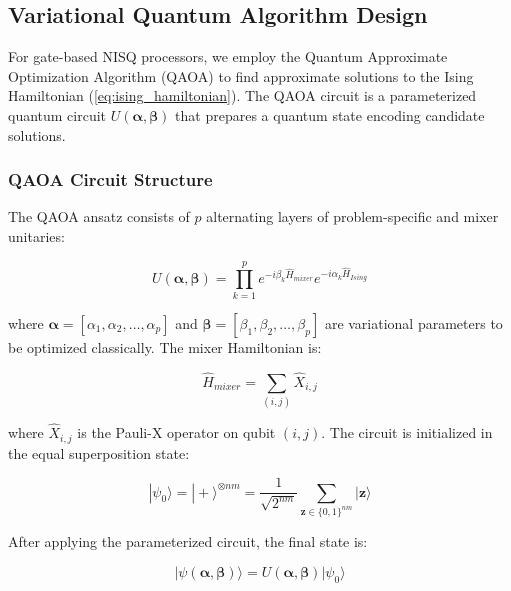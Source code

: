 \documentclass[lettersize,journal]{IEEEtran}
\begin{document}
\subsection{Variational Quantum Algorithm Design}
\label{subsec:vqa_design}

For gate-based NISQ processors, we employ the Quantum Approximate Optimization Algorithm (QAOA) to find approximate solutions to the Ising Hamiltonian (\ref{eq:ising_hamiltonian}). The QAOA circuit is a parameterized quantum circuit $U(\boldsymbol{\alpha}, \boldsymbol{\beta})$ that prepares a quantum state encoding candidate solutions.

\subsubsection{QAOA Circuit Structure}

The QAOA ansatz consists of $p$ alternating layers of problem-specific and mixer unitaries:

\begin{equation}
U(\boldsymbol{\alpha}, \boldsymbol{\beta}) = \prod_{k=1}^{p} e^{-i\beta_k \hat{H}_{mixer}} e^{-i\alpha_k \hat{H}_{Ising}}
\label{eq:qaoa_circuit}
\end{equation}

where $\boldsymbol{\alpha} = [\alpha_1, \alpha_2, \ldots, \alpha_p]$ and $\boldsymbol{\beta} = [\beta_1, \beta_2, \ldots, \beta_p]$ are variational parameters to be optimized classically. The mixer Hamiltonian is:

\begin{equation}
\hat{H}_{mixer} = \sum_{(i,j)} \hat{X}_{i,j}
\label{eq:mixer_hamiltonian}
\end{equation}

where $\hat{X}_{i,j}$ is the Pauli-X operator on qubit $(i,j)$. The circuit is initialized in the equal superposition state:

\begin{equation}
|\psi_0\rangle = |+\rangle^{\otimes nm} = \frac{1}{\sqrt{2^{nm}}} \sum_{\mathbf{z} \in \{0,1\}^{nm}} |\mathbf{z}\rangle
\label{eq:initial_state}
\end{equation}

After applying the parameterized circuit, the final state is:

\begin{equation}
|\psi(\boldsymbol{\alpha}, \boldsymbol{\beta})\rangle = U(\boldsymbol{\alpha}, \boldsymbol{\beta}) |\psi_0\rangle
\label{eq:final_state}
\end{equation}
\end{document}
